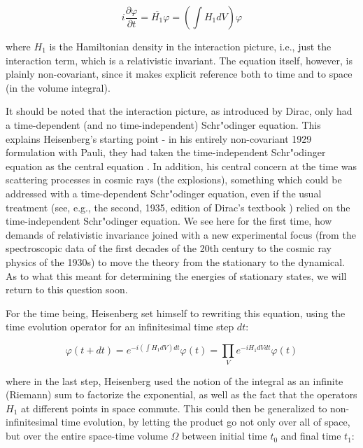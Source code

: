 \documentclass[12pt]{article}
\begin{document}
\begin{equation}
i \frac{\partial \varphi}{\partial t} = \overline{H_1} \varphi = \left( \int H_1 dV \right) \varphi
\end{equation}

where $H_1$ is the Hamiltonian density in the interaction picture, i.e., just the interaction term, which is a relativistic invariant. The equation itself, however, is plainly non-covariant, since it makes explicit reference both to time and to space (in the volume integral).

It should be noted that the interaction picture, as introduced by Dirac, only had a time-dependent (and no time-independent) Schr"odinger equation. This explains Heisenberg's starting point - in his entirely non-covariant 1929 formulation with Pauli, they had taken the time-independent Schr"odinger equation as the central equation \citep{heisenberg_1929_zur-quantendynamik}. In addition, his central concern at the time was scattering processes in cosmic rays (the explosions), something which could be addressed with a time-dependent Schr"odinger equation, even if the usual treatment (see, e.g., the second, 1935, edition of Dirac's textbook \citep{dirac_1935_the-principles}) relied on the time-independent Schr"odinger equation. We see here for the first time, how demands of relativistic invariance joined with a new experimental focus (from the spectroscopic data of the first decades of the 20th century to the cosmic ray physics of the 1930s) to move the theory from the stationary to the dynamical. As to what this meant for determining the energies of stationary states, we will return to this question soon.

For the time being, Heisenberg set himself to rewriting this equation, using the time evolution operator for an infinitesimal time step $dt$:

\begin{equation}
\varphi (t + dt) = e^{-i \left( \int H_1 dV \right) dt} \varphi(t) = \prod_V e^{-i H_1 dV dt} \varphi(t)
\end{equation}

where in the last step, Heisenberg used the notion of the integral as an infinite (Riemann) sum to factorize the exponential, as well as the fact that the operators $H_1$ at different points in space commute. This could then be generalized to non-infinitesimal time evolution, by letting the product go not only over all of space, but over the entire space-time volume $\Omega$ between initial time $t_0$ and final time $t_1$:
\end{document}
